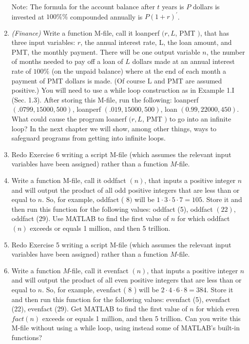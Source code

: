 \documentclass[../main.tex]{subfiles}
\begin{document}
\begin{enumerate}
Note: The formula for the account balance after $t$ years is $P$ dollars is invested at $100 \% \%$ compounded annually is $P(1+r)^{\prime}$.

\item  \emph{(Finance)} Write a function M-file, call it loanperf $(r, L$, PMT $)$, that has three input variables: $r$, the annual interest rate, L, the loan amount, and PMT, the monthly payment. There will be one output variable $n$, the number of months needed to pay off a loan of $L$ dollars made at an annual interest rate of $100 \%$ (on the unpaid balance) where at the end of each month a payment of PMT dollars is made. (Of course $\mathrm{L}$ and PMT are assumed positive.) You will need to use a while loop construction as in Example 1.I (Sec. 1.3). After storing this M-file, run the following: loanperf $(.0799,15000,500)$, loanperf $(.019,15000,500)$, loan $(0.99,22000,450)$. What could cause the program loanerf $(r, L$, PMT $)$ to go into an infinite loop? In the next chapter we will show, among other things, ways to safeguard programs from getting into infinite loops.

\item Redo Exercise 6 writing a script M-file (which assumes the relevant input variables have been assigned) rather than a function $M$-file.

\item Write a function M-file, call it oddfact $(n)$, that inputs a positive integer $n$ and will output the product of all odd positive integers that are less than or equal to $n$. So, for example, oddfact ( 8$)$ will be $1 \cdot 3 \cdot 5 \cdot 7=105$. Store it and then run this function for the following values: oddfact (5), oddfact $(22)$, oddfact (29). Use MATLAB to find the first value of $n$ for which oddfact $(n)$ exceeds or equals 1 million, and then 5 trillion.
\item Redo Exercise 5 writing a script M-file (which assumes the relevant input variables have been assigned) rather than a function $M$-file.
  \item Write a function $M$-file, call it evenfact $(n)$, that inputs a positive integer $n$ and will output the product of all even positive integers that are less than or equal to $n$. So, for example, evenfact ( 8 ) will be $2 \cdot 4 \cdot 6 \cdot 8=384$. Store it and then run this function for the following values: evenfact (5), evenfact (22), evenfact (29). Get MATLAB to find the first value of $n$ for which even $f a c t(n)$ exceeds or equals 1 million, and then 5 trillion. Can you write this M-file without using a while loop, using instead some of MATLAB's built-in functions?


\end{enumerate}
\end{document}
